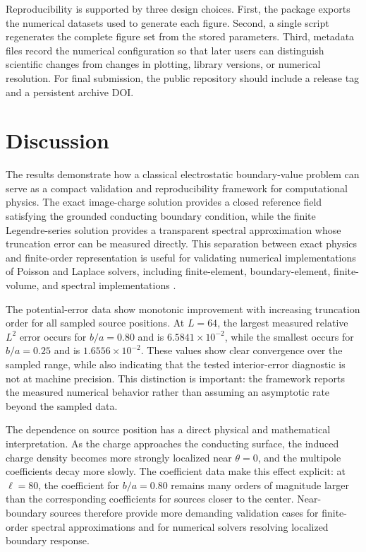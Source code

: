 \documentclass[preprint,12pt]{elsarticle}
\begin{document}
Reproducibility is supported by three design choices. First, the package exports the numerical datasets used to generate each figure. Second, a single script regenerates the complete figure set from the stored parameters. Third, metadata files record the numerical configuration so that later users can distinguish scientific changes from changes in plotting, library versions, or numerical resolution. For final submission, the public repository should include a release tag and a persistent archive DOI.

\section{Discussion}\label{sec:discussion}

The results demonstrate how a classical electrostatic boundary-value problem can serve as a compact validation and reproducibility framework for computational physics. The exact image-charge solution provides a closed reference field satisfying the grounded conducting boundary condition, while the finite Legendre-series solution provides a transparent spectral approximation whose truncation error can be measured directly. This separation between exact physics and finite-order representation is useful for validating numerical implementations of Poisson and Laplace solvers, including finite-element, boundary-element, finite-volume, and spectral implementations \cite{beer2008,liu2010,jin2014,cheng2005,pittino2014}.

The potential-error data show monotonic improvement with increasing truncation order for all sampled source positions. At $L=64$, the largest measured relative $L^2$ error occurs for $b/a=0.80$ and is $6.5841\times10^{-2}$, while the smallest occurs for $b/a=0.25$ and is $1.6556\times10^{-2}$. These values show clear convergence over the sampled range, while also indicating that the tested interior-error diagnostic is not at machine precision. This distinction is important: the framework reports the measured numerical behavior rather than assuming an asymptotic rate beyond the sampled data.

The dependence on source position has a direct physical and mathematical interpretation. As the charge approaches the conducting surface, the induced charge density becomes more strongly localized near $\theta=0$, and the multipole coefficients decay more slowly. The coefficient data make this effect explicit: at $\ell=80$, the coefficient for $b/a=0.80$ remains many orders of magnitude larger than the corresponding coefficients for sources closer to the center. Near-boundary sources therefore provide more demanding validation cases for finite-order spectral approximations and for numerical solvers resolving localized boundary response.
\end{document}
